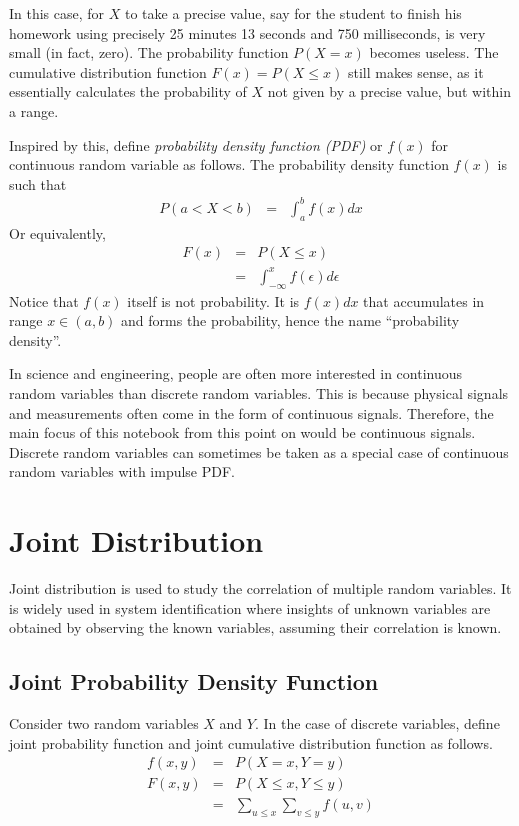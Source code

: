 In this case, for $X$ to take a precise value, say for the student to finish his homework using precisely 25 minutes 13 seconds and 750 milliseconds, is very small (in fact, zero). The probability function $P(X=x)$ becomes useless. The cumulative distribution function $F(x) = P(X\leq x)$ still makes sense, as it essentially calculates the probability of $X$ not given by a precise value, but within a range.

Inspired by this, define \textit{probability density function (PDF)} or $f(x)$ for continuous random variable as follows. The probability density function $f(x)$ is such that
\begin{eqnarray}
  P(a < X < b) &=& \int_{a}^{b}f(x)dx \nonumber
\end{eqnarray}
Or equivalently,
\begin{eqnarray}
  F(x) &=& P(X\leq x) \nonumber \\
  &=& \int_{-\infty}^{x} f(\epsilon)d\epsilon \nonumber
\end{eqnarray}
Notice that $f(x)$ itself is not probability. It is $f(x)dx$ that accumulates in range $x \in (a, b)$ and forms the probability, hence the name ``probability density''.

In science and engineering, people are often more interested in continuous random variables than discrete random variables. This is because physical signals and measurements often come in the form of continuous signals. Therefore, the main focus of this notebook from this point on would be continuous signals. Discrete random variables can sometimes be taken as a special case of continuous random variables with impulse PDF.

\section{Joint Distribution}

Joint distribution is used to study the correlation of multiple random variables. It is widely used in system identification where insights of unknown variables are obtained by observing the known variables, assuming their correlation is known.

\subsection{Joint Probability Density Function}

Consider two random variables $X$ and $Y$. In the case of discrete variables, define joint probability function and joint cumulative distribution function as follows.
\begin{eqnarray}
  f(x, y) &=& P\left(X=x, Y=y\right) \nonumber \\
  F(x, y) &=& P\left(X\leq x, Y\leq y\right) \nonumber \\
  &=& \sum_{u\leq x}\sum_{v\leq y}f(u, v) \nonumber
\end{eqnarray}

